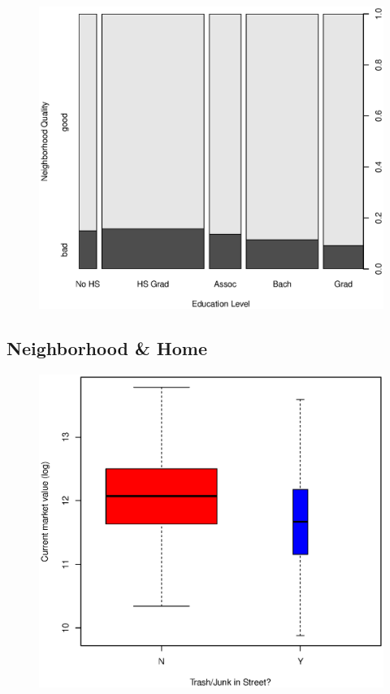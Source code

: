 \documentclass[11pt, fleqn]{article}
\begin{document}
\begin{figure}[!htb]
  \centering
  \includegraphics[scale=.5]{neighborhood_quality_vs_education.eps}
  \caption{}
  \label{fig:education_qual}
\end{figure}

\subsection{Neighborhood \& Home}

\begin{figure}[!htb]
  \centering
  \includegraphics[scale=.5]{ejunk.eps}
  \caption{}
  \label{fig:ejunk}
\end{figure}
\end{document}

